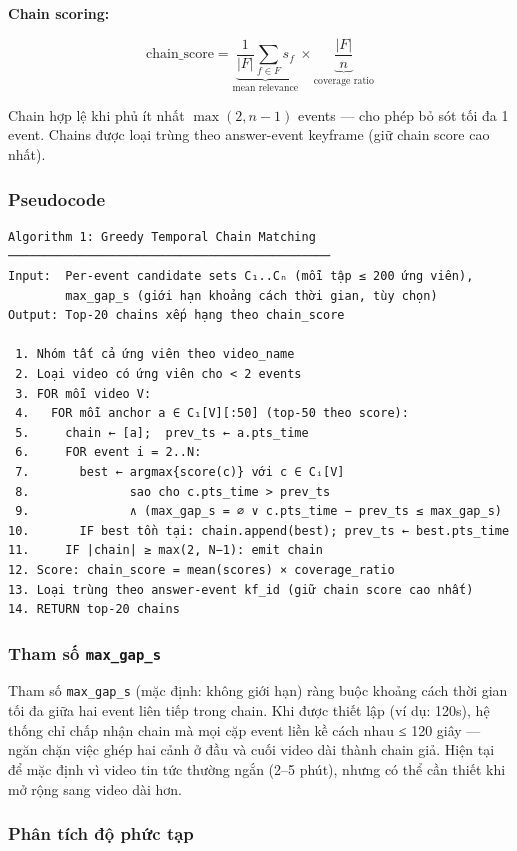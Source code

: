 \documentclass[12pt,a4paper,onecolumn]{article}
\begin{document}
\textbf{Chain scoring:}

$$\text{chain\_score} = \underbrace{\frac{1}{|F|} \sum_{f \in F} s_f}_{\text{mean relevance}} \times \underbrace{\frac{|F|}{n}}_{\text{coverage ratio}}$$

Chain hợp lệ khi phủ ít nhất $\max(2, n-1)$ events — cho phép bỏ sót tối đa 1 event. Chains được loại trùng theo answer-event keyframe (giữ chain score cao nhất).

\subsubsection{Pseudocode}

\begin{lstlisting}[]
Algorithm 1: Greedy Temporal Chain Matching
─────────────────────────────────────────────
Input:  Per-event candidate sets C₁..Cₙ (mỗi tập ≤ 200 ứng viên),
        max_gap_s (giới hạn khoảng cách thời gian, tùy chọn)
Output: Top-20 chains xếp hạng theo chain_score

 1. Nhóm tất cả ứng viên theo video_name
 2. Loại video có ứng viên cho < 2 events
 3. FOR mỗi video V:
 4.   FOR mỗi anchor a ∈ C₁[V][:50] (top-50 theo score):
 5.     chain ← [a];  prev_ts ← a.pts_time
 6.     FOR event i = 2..N:
 7.       best ← argmax{score(c)} với c ∈ Cᵢ[V]
 8.              sao cho c.pts_time > prev_ts
 9.              ∧ (max_gap_s = ∅ ∨ c.pts_time − prev_ts ≤ max_gap_s)
10.       IF best tồn tại: chain.append(best); prev_ts ← best.pts_time
11.     IF |chain| ≥ max(2, N−1): emit chain
12. Score: chain_score = mean(scores) × coverage_ratio
13. Loại trùng theo answer-event kf_id (giữ chain score cao nhất)
14. RETURN top-20 chains
\end{lstlisting}


\subsubsection{Tham số \texttt{max\_gap\_s}}

Tham số \texttt{max\_gap\_s} (mặc định: không giới hạn) ràng buộc khoảng cách thời gian tối đa giữa hai event liên tiếp trong chain. Khi được thiết lập (ví dụ: 120s), hệ thống chỉ chấp nhận chain mà mọi cặp event liền kề cách nhau ≤ 120 giây — ngăn chặn việc ghép hai cảnh ở đầu và cuối video dài thành chain giả. Hiện tại để mặc định vì video tin tức thường ngắn (2–5 phút), nhưng có thể cần thiết khi mở rộng sang video dài hơn.

\subsubsection{Phân tích độ phức tạp}
\end{document}
